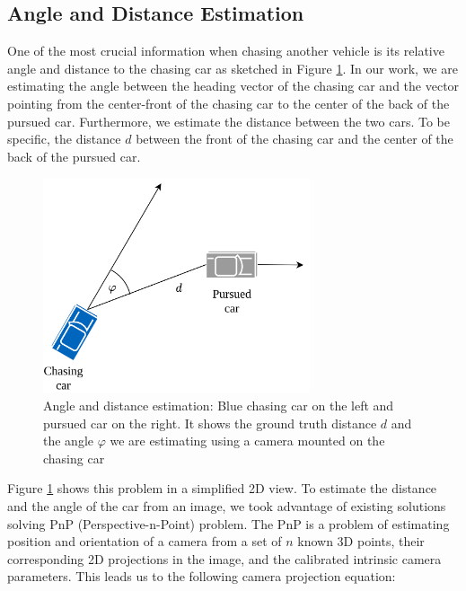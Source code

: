 \documentclass{ctuthesis/ctuthesis}
\begin{document}
\subsection{Angle and Distance Estimation}
One of the most crucial information when chasing another vehicle is its relative angle and distance to the chasing car as sketched in Figure \ref{f:chasing_diagram}. In our work, we are estimating the angle between the heading vector of the chasing car and the vector pointing from the center-front of the chasing car to the center of the back of the pursued car. Furthermore, we estimate the distance between the two cars. To be specific, the distance $d$ between the front of the chasing car and the center of the back of the pursued car. \par


\begin{figure}[h!]
    \centering
    \includegraphics[width=0.7\textwidth]{images/ChasingDiagram.png}
    
    \caption{Angle and distance estimation: Blue chasing car on the left and pursued car on the right. It shows the ground truth distance $d$ and the angle $\varphi$ we are estimating using a camera mounted on the chasing car }\label{f:chasing_diagram}
\end{figure}

Figure \ref{f:chasing_diagram} shows this problem in a simplified 2D view. To estimate the distance and the angle of the car from an image, we took advantage of existing solutions solving PnP (Perspective-n-Point) problem. The PnP is a problem of estimating position and orientation of a camera from a set of $n$ known 3D points, their corresponding 2D projections in the image, and the calibrated intrinsic camera parameters. This leads us to the following camera projection equation: \par
\end{document}
